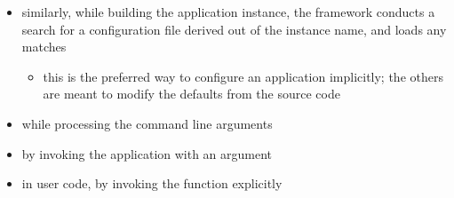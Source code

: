 \begin{frame}
\begin{itemize}
\begin{itemize}
    \end{itemize}
%
  \item similarly, while building the application instance, the framework conducts a search for
    a configuration file derived out of the instance name, and loads any matches
    \begin{itemize}
    \item this is the preferred way to configure an application implicitly; the others are
      meant to modify the defaults from the source code
    \end{itemize}
%
  \item while processing the command line arguments
%
  \item by invoking the application with an  argument
%
  \item in user code, by invoking the function  explicitly
%
  \end{itemize}
%
\end{frame}

